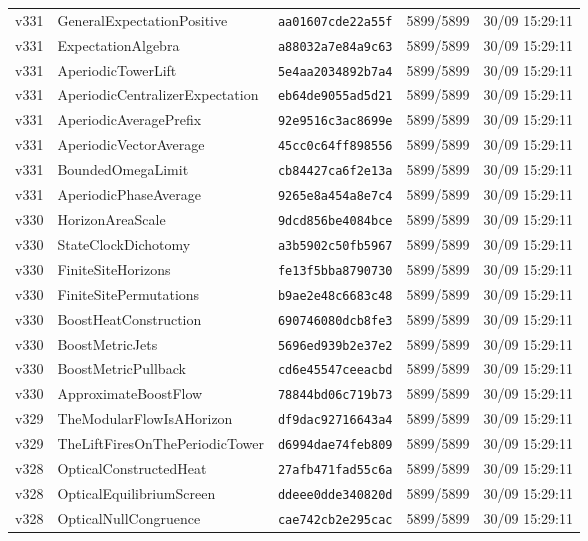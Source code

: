 \documentclass[11pt]{article}
\theoremstyle{definition}\newtheorem{deriv}{Derivação}
\begin{document}
{\begin{longtable}{@{}lllll@{}}
v331 & GeneralExpectationPositive & \texttt{aa01607cde22a55f} & 5899/5899 & 30/09 15:29:11 \\
v331 & ExpectationAlgebra & \texttt{a88032a7e84a9c63} & 5899/5899 & 30/09 15:29:11 \\
v331 & AperiodicTowerLift & \texttt{5e4aa2034892b7a4} & 5899/5899 & 30/09 15:29:11 \\
v331 & AperiodicCentralizerExpectation & \texttt{eb64de9055ad5d21} & 5899/5899 & 30/09 15:29:11 \\
v331 & AperiodicAveragePrefix & \texttt{92e9516c3ac8699e} & 5899/5899 & 30/09 15:29:11 \\
v331 & AperiodicVectorAverage & \texttt{45cc0c64ff898556} & 5899/5899 & 30/09 15:29:11 \\
v331 & BoundedOmegaLimit & \texttt{cb84427ca6f2e13a} & 5899/5899 & 30/09 15:29:11 \\
v331 & AperiodicPhaseAverage & \texttt{9265e8a454a8e7c4} & 5899/5899 & 30/09 15:29:11 \\
v330 & HorizonAreaScale & \texttt{9dcd856be4084bce} & 5899/5899 & 30/09 15:29:11 \\
v330 & StateClockDichotomy & \texttt{a3b5902c50fb5967} & 5899/5899 & 30/09 15:29:11 \\
v330 & FiniteSiteHorizons & \texttt{fe13f5bba8790730} & 5899/5899 & 30/09 15:29:11 \\
v330 & FiniteSitePermutations & \texttt{b9ae2e48c6683c48} & 5899/5899 & 30/09 15:29:11 \\
v330 & BoostHeatConstruction & \texttt{690746080dcb8fe3} & 5899/5899 & 30/09 15:29:11 \\
v330 & BoostMetricJets & \texttt{5696ed939b2e37e2} & 5899/5899 & 30/09 15:29:11 \\
v330 & BoostMetricPullback & \texttt{cd6e45547ceeacbd} & 5899/5899 & 30/09 15:29:11 \\
v330 & ApproximateBoostFlow & \texttt{78844bd06c719b73} & 5899/5899 & 30/09 15:29:11 \\
v329 & TheModularFlowIsAHorizon & \texttt{df9dac92716643a4} & 5899/5899 & 30/09 15:29:11 \\
v329 & TheLiftFiresOnThePeriodicTower & \texttt{d6994dae74feb809} & 5899/5899 & 30/09 15:29:11 \\
v328 & OpticalConstructedHeat & \texttt{27afb471fad55c6a} & 5899/5899 & 30/09 15:29:11 \\
v328 & OpticalEquilibriumScreen & \texttt{ddeee0dde340820d} & 5899/5899 & 30/09 15:29:11 \\
v328 & OpticalNullCongruence & \texttt{cae742cb2e295cac} & 5899/5899 & 30/09 15:29:11 \\

\end{longtable}}
\end{document}
